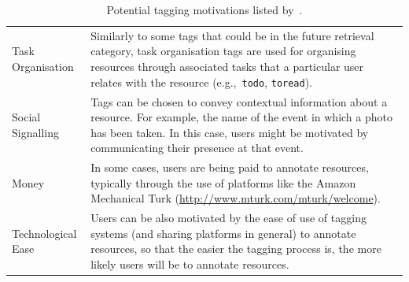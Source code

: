 \begin{table}[p]
\begin{threeparttable}
\begin{tabular}{@{}lp{9cm}@{}}
Task Organisation & Similarly to some tags that could be in the future retrieval category, task organisation tags are used for organising resources through associated tasks that a particular user relates with the resource (e.g.,~\texttt{todo}, \texttt{toread}). \\

Social Signalling & Tags can be chosen to convey contextual information about a resource. For example, the name of the event in which a photo has been taken. In this case, users might be motivated by communicating their presence at that event. \\

Money & In some cases, users are being paid to annotate resources, typically through the use of platforms like the Amazon Mechanical Turk (\url{http://www.mturk.com/mturk/welcome}). \\%

Technological Ease & Users can be also motivated by the ease of use of tagging systems (and sharing platforms in general) to annotate resources, so that the easier the tagging process is, the more likely users will be to annotate resources. \\
\bottomrule
\end{tabular}
\caption[Potential tagging motivations listed by~\cite{Gupta2010}]{Potential tagging motivations listed by~\cite{Gupta2010}.}
\label{tab:tagging_motivations}
\end{threeparttable}
\end{table}

